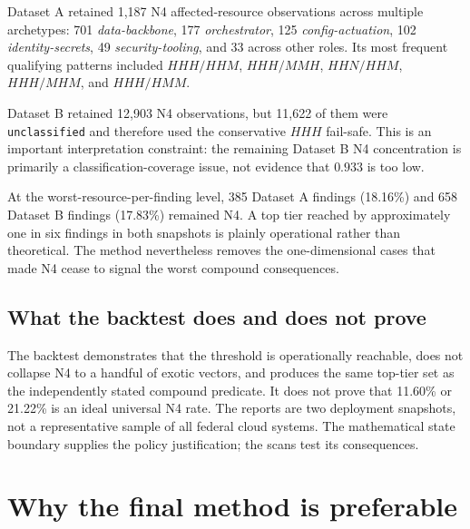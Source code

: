 \documentclass[11pt]{article}
\newcommand{\code}[1]{\texttt{#1}}
\begin{document}
Dataset A retained 1,187 N4 affected-resource observations across multiple archetypes:
701 \emph{data-backbone}, 177 \emph{orchestrator}, 125
\emph{config-actuation}, 102 \emph{identity-secrets}, 49
\emph{security-tooling}, and 33 across other roles. Its most frequent qualifying
patterns included $HHH/HHM$, $HHH/MMH$, $HHN/HHM$, $HHH/MHM$, and $HHH/HMM$.

Dataset B retained 12,903 N4 observations, but 11,622 of them were
\code{unclassified} and therefore used the conservative $HHH$ fail-safe. This is an
important interpretation constraint: the remaining Dataset B N4 concentration is
primarily a classification-coverage issue, not evidence that $0.933$ is too low.

At the worst-resource-per-finding level, 385 Dataset A findings (18.16\%) and 658
Dataset B findings (17.83\%) remained N4. A top tier reached by approximately one in
six findings in both snapshots is plainly operational rather than theoretical. The
method nevertheless removes the one-dimensional cases that made N4 cease to signal
the worst compound consequences.

\subsection{What the backtest does and does not prove}

The backtest demonstrates that the threshold is operationally reachable, does not
collapse N4 to a handful of exotic vectors, and produces the same top-tier set as
the independently stated compound predicate. It does not prove that 11.60\% or
21.22\% is an ideal universal N4 rate. The reports are two deployment snapshots,
not a representative sample of all federal cloud systems. The mathematical state
boundary supplies the policy justification; the scans test its consequences.

\section{Why the final method is preferable}
\end{document}
